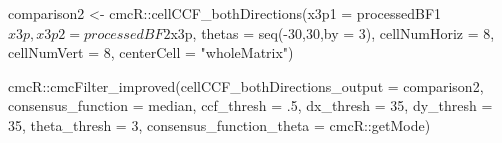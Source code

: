\begin{example*}
comparison2 <- cmcR::cellCCF_bothDirections(x3p1 = processedBF1$x3p,
                                            x3p2 = processedBF2$x3p,
                                            thetas = seq(-30,30,by = 3),
                                            cellNumHoriz = 8,
                                            cellNumVert = 8,
                                            centerCell = "wholeMatrix")

cmcR::cmcFilter_improved(cellCCF_bothDirections_output = comparison2,
                         consensus_function = median,
                         ccf_thresh = .5,
                         dx_thresh = 35,
                         dy_thresh = 35,
                         theta_thresh = 3,
                         consensus_function_theta = cmcR::getMode)
\end{example*}

